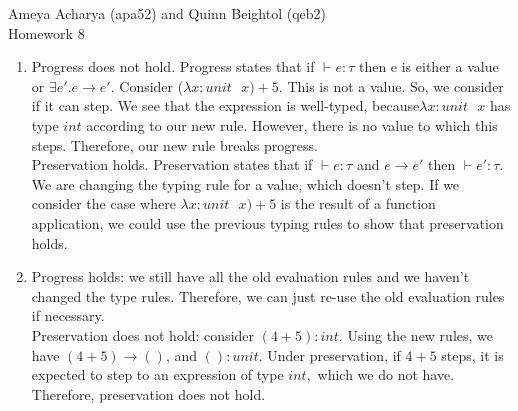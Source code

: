 \documentclass[10pt]{article}
\begin{document}
Ameya Acharya (apa52) and Quinn Beightol (qeb2)\\

Homework 8\\


\begin{exercise}
\begin{enumerate}
\item   Progress does not hold. Progress states that if $\vdash e: \tau$ then e is either a value or $\exists e'. e \rightarrow e'.$ Consider ($\lambda x: unit \text{ } x) + 5$. This is not a value. So, we consider if it can step. We see that the expression is well-typed, because$\lambda x: unit \text{ } x$ has type $int$ according to our new rule. However, there is no value to which this steps. Therefore, our new rule breaks progress. \\

Preservation holds. Preservation states that if $\vdash e: \tau$ and $e \rightarrow e'$ then $\vdash e': \tau$. We are changing the typing rule for a value, which doesn't step. If we consider the case where $\lambda x: unit \text{ } x) + 5$ is the result of a function application, we could use the previous typing rules to show that preservation holds.

\item  Progress holds: we still have all the old evaluation rules and we haven't changed the type rules. Therefore, we can just re-use the old evaluation rules if necessary.\\

Preservation does not hold: consider $(4 + 5) : int$. Using the new rules, we have $(4 + 5) \rightarrow ()$, and $() : unit.$ Under preservation, if $4 + 5$ steps, it is expected to step to an expression of type $int,$ which we do not have. Therefore, preservation does not hold.
 
\end{enumerate}
\end{exercise}
\end{document}
